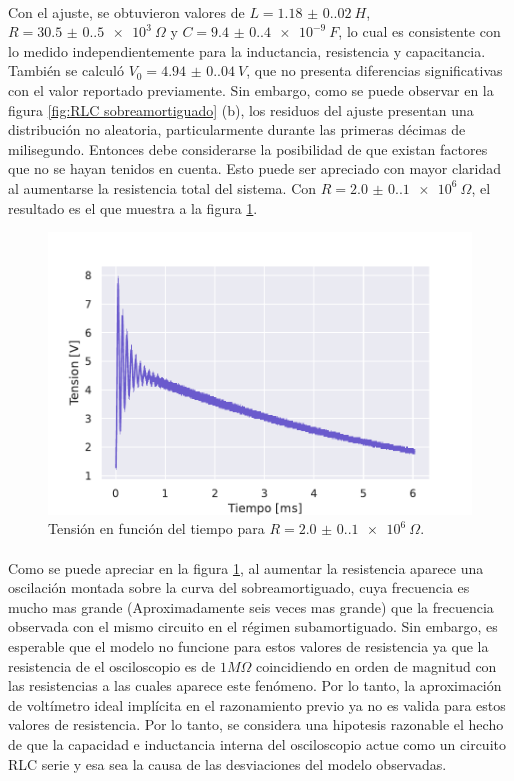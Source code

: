 \paragraph{}
Con el ajuste, se obtuvieron valores de $L = \SI{1.18(0.02)}{H}$, $R = \SI{30.5(0.5)e3}{\Omega}$ y $C = \SI{9.4(0.4)e-9}{F}$, lo cual es consistente con lo medido independientemente para la inductancia, resistencia y capacitancia. También se calculó $V_0 = \SI{4.94(0.04)}{V}$, que no presenta diferencias significativas con el valor reportado previamente. Sin embargo, como se puede observar en la figura \ref{fig:RLC sobreamortiguado} (b), los residuos del ajuste presentan una distribución no aleatoria, particularmente durante las primeras décimas de milisegundo. Entonces debe considerarse la posibilidad de que existan factores que no se hayan tenidos en cuenta. Esto puede ser apreciado con mayor claridad al aumentarse la resistencia total del sistema. Con $R =\SI{2.0(0.1)e6}{\Omega}$, el resultado es el que muestra a la figura \ref{fig:falopa}.
\begin{figure} [H]
    \centering
    \includegraphics[scale=0.7]{Figuras/Falopa/falopa.pdf}
    \caption{Tensión en función del tiempo para $R=\SI{2.0(0.1)e6}{\Omega}$.}
    \label{fig:falopa}
\end{figure}
\paragraph{}
Como se puede apreciar en la figura \ref{fig:falopa}, al aumentar la resistencia aparece una oscilación montada sobre la curva del sobreamortiguado, cuya frecuencia es mucho mas grande (Aproximadamente seis veces mas grande) que la frecuencia observada con el mismo circuito en el régimen subamortiguado. Sin embargo, es esperable que el modelo no funcione para estos valores de resistencia ya que la resistencia de el osciloscopio es de $1M\Omega$\cite{manual_osciloscopio} coincidiendo en orden de magnitud con las resistencias a las cuales aparece este fenómeno. Por lo tanto, la aproximación de voltímetro ideal implícita en el razonamiento previo ya no es valida para estos valores de resistencia. Por lo tanto, se considera una hipotesis razonable el hecho de que la capacidad e inductancia interna del osciloscopio actue como un circuito RLC serie y esa sea la causa de las desviaciones del modelo observadas.

